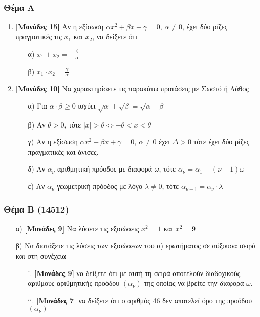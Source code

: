 \documentclass[12pt]{article}
\begin{document}
\part*{}

\section*{Θέμα Α}
  \noindent
  \begin{enumerate}
    \item \textbf{[Μονάδες 15]} Αν η εξίσωση $αx^2+βx+γ=0$, $α\ne 0$, έχει δύο ρίζες πραγματικές τις $x_1$ και $x_2$, να δείξετε ότι
      \begin{enumerate}
        \item [α)] $x_1+x_2=-\frac{β}{α}$
        \item [β)] $x_1\cdot x_2=\frac{γ}{α}$
      \end{enumerate}
    \item \textbf{[Μονάδες 10]} Να χαρακτηρίσετε τις παρακάτω προτάσεις με Σωστό ή Λάθος
    \begin{enumerate}
      \item [α)] Για $α\cdot β\ge 0$ ισχύει $\sqrt{α}+\sqrt{β}=\sqrt{α+β}$
      \item [β)] Αν $θ>0$, τότε $|x|>θ\iff -θ<x<θ$
      \item [γ)] Αν η εξίσωση $αx^2+βx+γ=0$, $α\ne 0 $ έχει $Δ>0$ τότε έχει δύο ρίζες πραγματικές και άνισες.
      \item [δ)] Αν $α_ν$ αριθμητική πρόοδος με διαφορά $ω$, τότε $α_ν=α_1+(ν-1)ω$
      \item [ε)] Αν $α_ν$ γεωμετρική πρόοδος με λόγο $λ\ne 0$, τότε $α_{ν+1}=α_ν\cdot λ$
    \end{enumerate}
  \end{enumerate}

\section*{Θέμα Β (14512)}
  \noindent
    \begin{enumerate}
      \item [α)] \textbf{[Μονάδες 9]} Να λύσετε τις εξισώσεις $x^2=1$ και $x^2=9$
      \item [β)] Να διατάξετε τις λύσεις των εξισώσεων του α) ερωτήματος σε αύξουσα σειρά και στη συνέχεια
        \begin{enumerate}
          \item [i.] \textbf{[Μονάδες 9]} να δείξετε ότι με αυτή τη σειρά αποτελούν διαδοχικούς αριθμούς αριθμητικής προόδου $(α_ν)$ της οποίας να βρείτε την διαφορά $ω$.
          \item [ii.] \textbf{[Μονάδες 7]} να δείξετε ότι ο αριθμός 46 δεν αποτελεί όρο της προόδου $(α_ν)$
        \end{enumerate}
    \end{enumerate}
\end{document}
